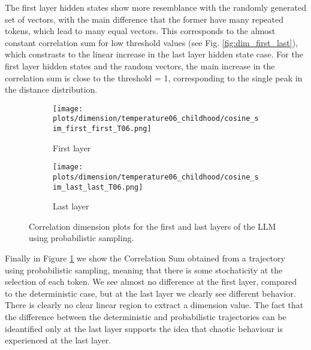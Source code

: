 \documentclass[a4paper,12pt]{article}
\begin{document}
The first layer hidden states show more resemblance with the randomly generated set of vectors, with the main difference that the former have many repeated tokens, which lead to many equal vectors. This corresponds to the almost constant correlation sum for low threshold values (see Fig. \ref{fig:dim_first_last}), which constrasts to the linear increase in the last layer hidden state case. For the first layer hidden states and the random vectors, the main increase in the correlation sum is close to the threshold = 1, corresponding to the single peak in the distance distribution.



\begin{figure}[H]
    \centering
    \begin{subfigure}[b]{0.32\textwidth}
        \centering
        \texttt{[image: plots/dimension/temperature06\_childhood/cosine\_sim\_first\_first\_T06.png]}
        \caption{First layer}
    \end{subfigure}\hfill
    \centering
    \begin{subfigure}[b]{0.32\textwidth}
        \centering
        \texttt{[image: plots/dimension/temperature06\_childhood/cosine\_sim\_last\_last\_T06.png]}
        \caption{Last layer}
    \end{subfigure}\hfill

    \caption{Correlation dimension plots for the first and last layers of the LLM using probabilistic sampling.}
    \label{fig:dim_first_last_temperature}
\end{figure}

Finally in Figure \ref{fig:dim_first_last_temperature} we show the Correlation Sum obtained from a trajectory using probabilistic sampling, meaning that there is some stochaticity at the selection of each token. We see almost no difference at the first layer, compared to the deterministic case, but at the last layer we clearly see different behavior. There is clearly no clear linear region to extract a dimension value.
The fact that the difference between the deterministic and probabilistic trajectories can be ideantified only at the last layer supports the idea that chaotic behaviour is experienced at the last layer.
\end{document}
